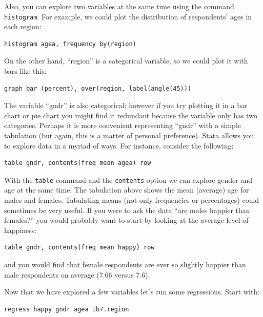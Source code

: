 \documentclass{article}
\begin{document}
Also, you can explore two variables at the same time using the command \texttt{histogram}. For example, we could plot the distribution of respondents' ages in each region:

\begin{lstlisting}
histogram agea, frequency by(region)
\end{lstlisting}

On the other hand, ``region'' is a categorical variable, so we could plot it with bars like this:

\begin{lstlisting}
graph bar (percent), over(region, label(angle(45)))
\end{lstlisting}

The variable ``gndr'' is also categorical; however if you try plotting it in a bar chart or pie chart you might find it redundant because the variable only has two categories. Perhaps it is more convenient representing ``gndr'' with a simple tabulation (but again, this is a matter of personal preference). Stata allows you to explore data in a myriad of ways. For instance, consider the following:

\begin{lstlisting}
table gndr, contents(freq mean agea) row
\end{lstlisting}

With the \texttt{table} command and the \texttt{contents} option we can explore gender and age at the same time. The tabulation above shows the mean (average) age for males and females. Tabulating means (not only frequencies or percentages) could sometimes be very useful. If you were to ask the data ``are males happier than females?'' you would probably want to start by looking at the average level of happiness:

\begin{lstlisting}
table gndr, contents(freq mean happy) row
\end{lstlisting}

and you would find that female respondents are ever so slightly happier than male respondents on average (7.66 versus 7.6).

Now that we have explored a few variables let's run some regressions. Start with:

\begin{lstlisting}
regress happy gndr agea ib7.region
\end{lstlisting}
\end{document}
